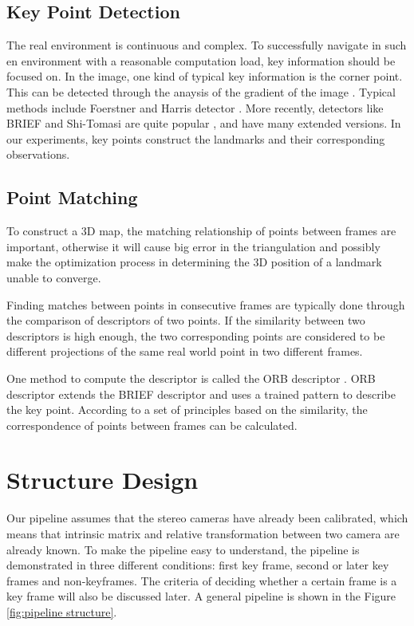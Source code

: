 \documentclass[11pt]{easychair}
\begin{document}
\subsection{Key Point Detection}
The real environment is continuous and complex. To successfully navigate in such en environment with a reasonable computation load, key information should be focused on. In the image, one kind of typical key information is the corner point. This can be detected through the anaysis of the gradient of the image \cite{gradient}. Typical methods include Foerstner and Harris detector \cite{detector}. More recently, detectors like BRIEF and Shi-Tomasi are quite popular \cite{brief} \cite{shitomasi}, and have many extended versions. In our experiments, key points construct the landmarks and their corresponding observations.

\subsection{Point Matching}
To construct a 3D map, the matching relationship of points between frames are important, otherwise it will cause big error in the triangulation and possibly make the optimization process in determining the 3D position of a landmark unable to converge.

Finding matches between points in consecutive frames are typically done through the comparison of descriptors of two points. If the similarity between two descriptors is high enough, the two corresponding points are considered to be different projections of the same real world point in two different frames. 

One method to compute the descriptor is called the ORB descriptor \cite{orb}. ORB descriptor extends the BRIEF descriptor \cite{brief} and uses a trained pattern to describe the key point. According to a set of principles based on the similarity, the correspondence of points between frames can be calculated.

\section{Structure Design}


Our pipeline assumes that the stereo cameras have already been calibrated, which means that intrinsic matrix and relative transformation between two camera are already known. To make the pipeline easy to understand, the pipeline is demonstrated in three different conditions: first key frame, second or later key frames and non-keyframes. The criteria of deciding whether a certain frame is a key frame will also be discussed later. A general pipeline is shown in the Figure \ref{fig:pipeline structure}.
\end{document}
